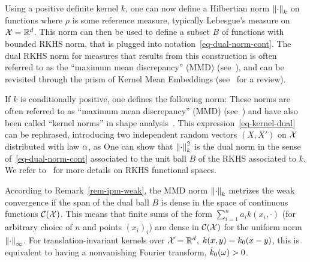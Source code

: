 Using a positive definite kernel $k$, one can now define a Hilbertian norm $\left\| \cdot \right\|_k$ on functions 
where $\rho$ is some reference measure, typically Lebesgue's measure on $\mathcal{X}=\mathbb{R}^d$. This norm can then be used to define a subset $B$ of functions with bounded RKHS norm,
%
that is plugged into notation~\eqref{eq-dual-norm-cont}. The dual RKHS norm for measures that results from this construction is often referred to as the ``maximum mean discrepancy'' (MMD) (see~\citet{gretton2007kernel}), and can be revisited through the prism of Kernel Mean Embeddings (see~\citet{muandet2017kernel} for a review). 
\fi 


If $k$ is conditionally positive, one defines the following norm:  
These norms are often referred to as ``maximum mean discrepancy'' (MMD) (see~\citep{gretton2007kernel}) and have also been called ``kernel norms'' in shape analysis~\citep{glaunes2004diffeomorphic}.
%
This expression~\eqref{eq-kernel-dual} can be rephrased, introducing two independent random vectors $(X,X')$ on $\mathcal{X}$ distributed with law $\alpha$, as
One can show that $\left\| \cdot \right\|^2_{k}$ is the dual norm in the sense of~\eqref{eq-dual-norm-cont} associated to the unit ball $B$ of the RKHS associated to $k$. We refer to~\citep{berlinet03reproducing,Hofmann2008,scholkopf2002learning} for more details on RKHS functional spaces.  

\begin{rem}
According to Remark~\ref{rem-ipm-weak}, the MMD norm $\left\| \cdot \right\|_k$ metrizes the weak convergence if the span of the dual ball $B$ is dense in the space of continuous functions $\mathcal{C}(\mathcal{X})$. This means that finite sums of the form $\sum_{i=1}^n a_i k(x_i,\cdot)$ (for arbitrary choice of $n$ and points $(x_i)_i$) are dense in $\mathcal{C}(\mathcal{X})$ for the uniform norm $\left\| \cdot \right\|_\infty$.  For translation-invariant kernels over $\mathcal{X}=\mathbb{R}^d$, $k(x,y)=k_0(x-y)$, this is equivalent to having a nonvanishing Fourier transform, $\hat {k}_0(\omega) >0$.
\end{rem}

